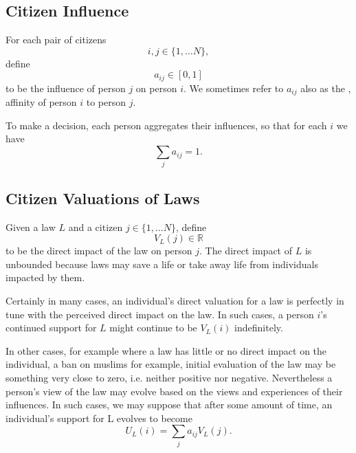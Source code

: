 \subsection {Citizen Influence}
For each pair of citizens $$i,j\in\{1,\dots N\},$$ define $$a_{ij}\in [0,1]$$ to be the influence of person $j$ on person $i$.  We sometimes refer to $a_{ij}$ also as the  , affinity of person $i$ to person $j$. 


To make a decision, each person aggregates their influences, so that for each $i$ we have $$\sum_ja_{ij}=1.$$%

\subsection{Citizen Valuations of Laws}
Given a law $L$ and a citizen $j\in\{1,\dots N\}$, %
define $$V_L(j)\in\mathbb{R}$$ to be the direct impact of the law on person $j$. The direct  impact of $L$ is unbounded because laws may save a life or take away life from individuals impacted by them.

Certainly in many cases, an individual's direct valuation for a law is perfectly in tune with the perceived direct impact on the law.  In such cases, a person $i$'s continued support for $L$ might continue to be $V_L(i)$ indefinitely. %

In other cases, for example where a law has little or no direct impact on the individual, a ban on muslims for example, initial evaluation of the law may be something very close to zero, i.e. neither positive nor negative.  Nevertheless a person's view of the law may evolve based on the views and experiences of their influences.  In such cases, we may suppose that after some amount of time, an individual's support for L evolves to become $$U_L(i)=\sum_ja_{ij}V_L(j).$$


